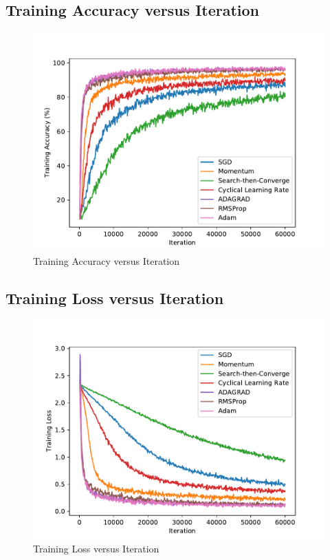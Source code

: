 \documentclass{article}
\begin{document}
\subsection{Training Accuracy versus Iteration}
\begin{figure}[H]
\includegraphics[width=\textwidth, keepaspectratio]{TrainAccuracy.pdf}	
\caption{Training Accuracy versus Iteration}
\end{figure}

\subsection{Training Loss versus Iteration}
\begin{figure}[H]
	\includegraphics[width=\textwidth, keepaspectratio]{TrainLoss.pdf}	
	\caption{Training Loss versus Iteration}
\end{figure}
\end{document}
